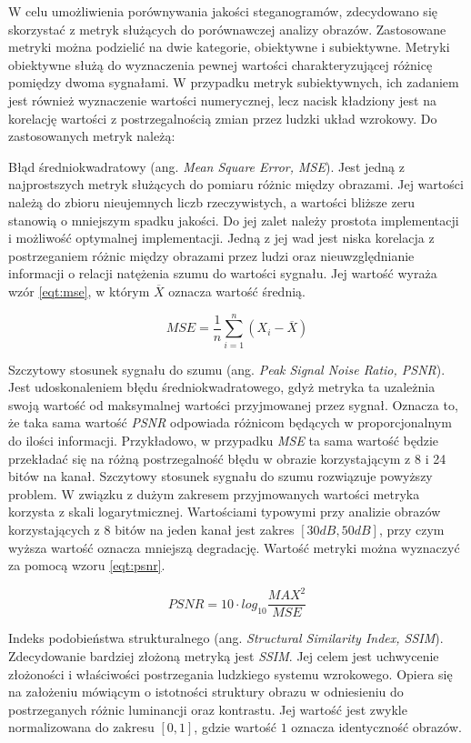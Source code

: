 {    %
    W celu umożliwienia porównywania jakości steganogramów, zdecydowano się skorzystać z metryk służących
    do porównawczej analizy obrazów. Zastosowane metryki można podzielić na dwie kategorie, obiektywne i subiektywne.
    Metryki obiektywne służą do wyznaczenia pewnej wartości charakteryzującej różnicę pomiędzy dwoma sygnałami. W
    przypadku metryk subiektywnych, ich zadaniem jest również wyznaczenie wartości numerycznej, lecz nacisk kładziony
    jest na korelację wartości z postrzegalnością zmian przez ludzki układ wzrokowy. Do zastosowanych metryk należą:

    Błąd średniokwadratowy (ang. \textit{Mean Square Error, MSE}). Jest jedną z najprostszych metryk służących do
    pomiaru różnic między obrazami. Jej wartości należą do zbioru nieujemnych liczb rzeczywistych, a wartości bliższe
    zeru stanowią o mniejszym spadku jakości. Do jej zalet należy prostota implementacji i możliwość optymalnej
    implementacji. Jedną z jej wad jest niska korelacja z postrzeganiem różnic między obrazami przez ludzi oraz
    nieuwzględnianie informacji o relacji natężenia szumu do wartości sygnału. Jej wartość wyraża wzór \ref{eqt:mse}, w
    którym $\overline{X}$ oznacza wartość średnią.

    \begin{equation}\label{eqt:mse}
        MSE = \frac{1}{n} \sum_{i=1}^n (X_i - \overline{X})
    \end{equation}

    Szczytowy stosunek sygnału do szumu (ang. \textit{Peak Signal Noise Ratio, PSNR}). Jest udoskonaleniem błędu
    średniokwadratowego, gdyż metryka ta uzależnia swoją wartość od maksymalnej wartości przyjmowanej przez sygnał.
    Oznacza to, że taka sama wartość \textit{PSNR} odpowiada różnicom będących w proporcjonalnym do ilości informacji.
    Przykładowo, w przypadku \textit{MSE} ta sama wartość będzie przekładać się na różną postrzegalność błędu w obrazie
    korzystającym z 8 i 24 bitów na kanał. Szczytowy stosunek sygnału do szumu rozwiązuje powyższy problem. W związku z
    dużym zakresem przyjmowanych wartości metryka korzysta z skali logarytmicznej. Wartościami typowymi przy analizie
    obrazów korzystających z 8 bitów na jeden kanał jest zakres $[30dB, 50dB]$, przy czym wyższa wartość oznacza
    mniejszą degradację. Wartość metryki można wyznaczyć za pomocą wzoru \ref{eqt:psnr}.

    \begin{equation}\label{eqt:psnr}
        PSNR = 10 \cdot log_{10} \frac{MAX^2}{MSE}
    \end{equation}

    Indeks podobieństwa strukturalnego (ang. \textit{Structural Similarity Index, SSIM}). Zdecydowanie bardziej złożoną
    metryką jest \textit{SSIM}. Jej celem jest uchwycenie złożoności i właściwości postrzegania ludzkiego systemu
    wzrokowego. Opiera się na założeniu mówiącym o istotności struktury obrazu w odniesieniu do postrzeganych różnic
    luminancji oraz kontrastu\cite{Wang2004ImageQA, Sara2019ImageQA}. Jej wartość jest zwykle normalizowana do zakresu
    $[0, 1]$, gdzie wartość $1$ oznacza identyczność obrazów.

}

